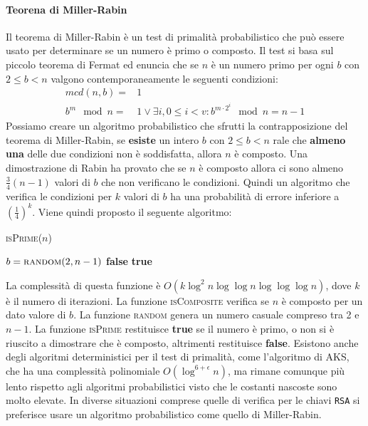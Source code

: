     \paragraph{Teorena di Miller-Rabin}
        Il teorema di Miller-Rabin è un test di primalità probabilistico che può essere usato per determinare se un numero è primo o composto. Il test si basa sul piccolo teorema di Fermat ed enuncia che se $n$ è un numero primo per ogni $b$ con $2\leq b < n$ valgono contemporaneamente le seguenti condizioni:
        \begin{align*}
            mcd(n,b)=&1\\
            b^m\mod n =& 1 \lor \exists i,0\leq i < v: b^{m\cdot 2^i} \mod n = n-1
        \end{align*}
        Possiamo creare un algoritmo probabilistico che sfrutti la contrapposizione del teorema di Miller-Rabin, se \textbf{esiste} un intero $b$ con $2\leq b < n$ rale che \textbf{almeno una} delle due condizioni non è soddisfatta, allora $n$ è composto. \newline
        Una dimostrazione di Rabin ha provato che se $n$ è composto allora ci sono almeno $\frac34(n-1)$ valori di $b$ che non verificano le condizioni. Quindi un algoritmo che verifica le condizioni per $k$ valori di $b$ ha una probabilità di errore inferiore a $\left(\frac{1}{4}\right)^k$. Viene quindi proposto il seguente algoritmo:
        \begin{algorithm}[H]
            \caption{\Bool \textsc{isPrime}(\Item $n$)}
            \begin{algorithmic}
                    \State $b = \Call{random}{2,n-1}$
                        \State \Return \textbf{false}
                    \EndIf
                \EndFor
                \State \Return \textbf{true}
            \end{algorithmic}
        \end{algorithm}
        La complessità di questa funzione è $O(k\log^2n\log\log n \log \log \log n)$, dove $k$ è il numero di iterazioni. La funzione \textsc{isComposite} verifica se $n$ è composto per un dato valore di $b$. La funzione \textsc{random} genera un numero casuale compreso tra 2 e $n-1$. La funzione \textsc{isPrime} restituisce \textbf{true} se il numero è primo, o non si è riuscito a dimostrare che è composto, altrimenti restituisce \textbf{false}.\newline
        Esistono anche degli algoritmi deterministici per il test di primalità, come l'algoritmo di AKS, che ha una complessità polinomiale $O(\log^{6+\epsilon} n)$, ma rimane comunque più lento rispetto agli algoritmi probabilistici visto che le costanti nascoste sono molto elevate. In diverse situazioni comprese quelle di verifica per le chiavi \texttt{RSA} si preferisce usare un algoritmo probabilistico come quello di Miller-Rabin.
